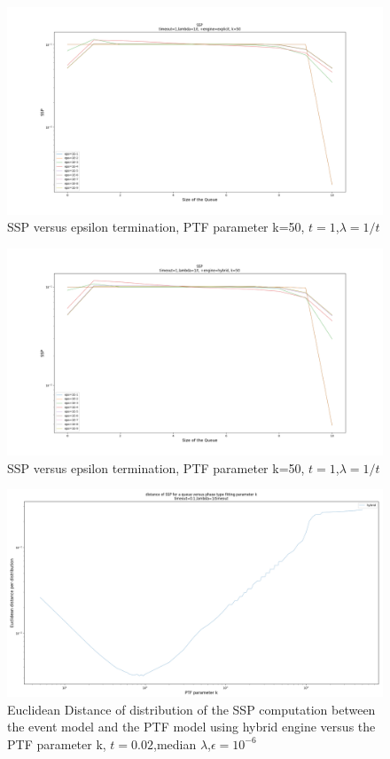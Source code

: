 \documentclass[paper=a4, fontsize=11pt]{scrartcl}
\numberwithin{equation}{section}		%
\numberwithin{figure}{section}			%
\numberwithin{table}{section}				%
\begin{document}
	\begin{figure}
		\centering
		\includegraphics[width=20cm]{picture/epsilon_explicit.png}
		\caption{SSP versus epsilon termination, PTF parameter k=50,	$t=1$,$\lambda=1/t$}
		\label{fig:epsilon_explicit}
	\end{figure}
	
	\begin{figure}
		\centering
		\includegraphics[width=20cm]{picture/epsilon_hybrid.png}
		\caption{SSP versus epsilon termination, PTF parameter k=50,	$t=1$,$\lambda=1/t$}
		\label{fig:epsilon_hybrid}
	\end{figure}
	
		\begin{figure}
			\centering
			\includegraphics[width=17cm]{picture/distance_hybrid2.png}
			\caption{Euclidean Distance of distribution of the SSP computation between the event model and the PTF model using hybrid engine versus the PTF parameter k,	$t=0.02$,median $\lambda$,$\epsilon=10^{-6}$}
			\label{fig:dist_hybrid_50k}
		\end{figure}
\end{document}
